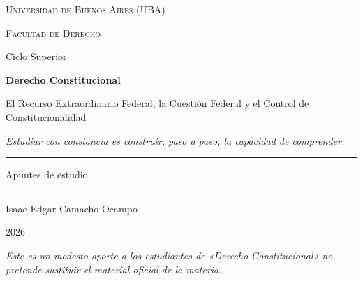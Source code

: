 \documentclass[12pt,oneside]{book}
\newcommand{\universidad}{Universidad de Buenos Aires (UBA)}
\newcommand{\facultad}{Facultad de Derecho}
\newcommand{\ciclo}{Ciclo Superior}
\newcommand{\materia}{Derecho Constitucional}
\newcommand{\titulo}{El Recurso Extraordinario Federal, la Cuestión Federal y el Control de Constitucionalidad}
\newcommand{\autor}{Isaac Edgar Camacho Ocampo}
\newcommand{\anio}{2026}
\begin{document}
\begin{titlepage}

\thispagestyle{empty}

\begin{center}

\vspace*{1cm}

{\large \textsc{\universidad}}

\vspace{0.2cm}

{\large \textsc{\facultad}}

\vspace{0.2cm}

{\large \ciclo}

\vspace{3cm}

{\Huge \textbf{\materia}}

\vspace{1cm}

{\LARGE \titulo}

\vspace{0.8cm}

\textit{Estudiar con constancia es construir, paso a paso, la capacidad de comprender.}

\vspace{1.2cm}

\rule{0.70\textwidth}{0.5pt}

\vspace{0.5cm}

{\large Apuntes de estudio}

\vspace{0.5cm}

\rule{0.70\textwidth}{0.5pt}

\vfill

{\large \autor}

\vspace{0.3cm}

{\large \anio}

\end{center}

\vfill

\begin{flushleft}
\textit{Este es un modesto aporte a los estudiantes de «\materia» no pretende sustituir el material oficial de la materia.}
\end{flushleft}

\end{titlepage}
\end{document}
